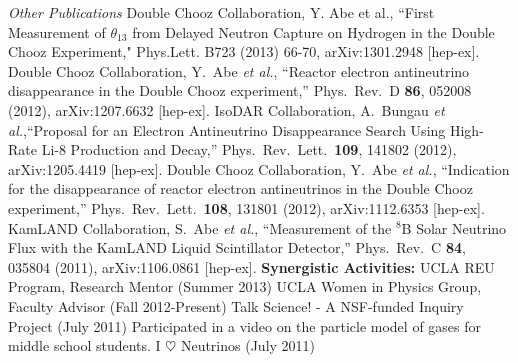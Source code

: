\newline\newline\noindent
{\it Other Publications}
\newline\noindent
Double Chooz Collaboration, Y. Abe et al., ``First Measurement of $\theta_{13}$ from Delayed Neutron Capture on Hydrogen in the Double Chooz Experiment," Phys.Lett. B723 (2013) 66-70, arXiv:1301.2948 [hep-ex].
\newline\newline\noindent
Double Chooz Collaboration, Y.~Abe {\it et al.}, ``Reactor electron antineutrino disappearance in the Double Chooz experiment,'' Phys.\ Rev.\ D {\bf 86}, 052008 (2012), arXiv:1207.6632 [hep-ex]. 
\newline\newline \noindent
IsoDAR Collaboration, A.~Bungau {\it et al.},``Proposal for an Electron Antineutrino Disappearance Search Using High-Rate Li-8 Production and Decay,'' Phys.\ Rev.\ Lett.\  {\bf 109}, 141802 (2012),  arXiv:1205.4419 [hep-ex].
\newline\newline \noindent
Double Chooz Collaboration, Y.~Abe {\it et al.}, ``Indication for the disappearance of reactor electron antineutrinos in the Double Chooz experiment,'' Phys.\ Rev.\ Lett.\  {\bf 108}, 131801 (2012), arXiv:1112.6353 [hep-ex].
\newline\newline \noindent
KamLAND Collaboration, S.~Abe {\it et al.}, ``Measurement of the $^8$B Solar Neutrino Flux with the KamLAND Liquid Scintillator Detector,'' Phys.\ Rev.\ C {\bf 84}, 035804 (2011), arXiv:1106.0861 [hep-ex].
\newline\newline \noindent
{\bf Synergistic Activities:}
\newline \noindent
UCLA REU Program, Research Mentor (Summer 2013)
\newline\newline\noindent
UCLA Women in Physics Group, Faculty Advisor (Fall 2012-Present)
\newline\newline \noindent
Talk Science! - A NSF-funded Inquiry Project (July 2011)
\newline \noindent
Participated in a video on the particle model of gases for middle school students.
\newline\newline \noindent
I $\heartsuit$ Neutrinos  (July 2011)
\newline \noindent
